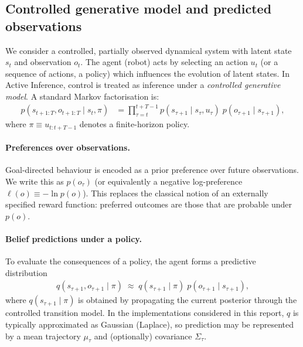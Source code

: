\documentclass[a4paper, twoside]{article}
\begin{document}
\subsection{Controlled generative model and predicted observations}
\label{sec:51_predictive_gm}

We consider a controlled, partially observed dynamical system with latent state $s_t$ and observation $o_t$. The agent (robot) acts by selecting an action $u_t$ (or a sequence of actions, a policy) which influences the evolution of latent states. In Active Inference, control is treated as inference under a \emph{controlled generative model}. A standard Markov factorisation is:
\begin{align}
p(s_{t+1:T}, o_{t+1:T} \mid s_t, \pi)
&=
\prod_{\tau=t}^{t+T-1}
p(s_{\tau+1} \mid s_{\tau}, u_\tau)\;
p(o_{\tau+1} \mid s_{\tau+1}),
\label{eq:controlled_generative_model}
\end{align}
where $\pi \equiv u_{t:t+T-1}$ denotes a finite-horizon policy.

\paragraph{Preferences over observations.}
Goal-directed behaviour is encoded as a prior preference over future observations. We write this as $p(o_\tau)$ (or equivalently a negative log-preference $\ell(o) \equiv -\ln p(o)$). This replaces the classical notion of an externally specified reward function: preferred outcomes are those that are probable under $p(o)$.

\paragraph{Belief predictions under a policy.}
To evaluate the consequences of a policy, the agent forms a predictive distribution
\begin{align}
q(s_{\tau+1}, o_{\tau+1} \mid \pi)
\;\approx\;
q(s_{\tau+1}\mid \pi)\;p(o_{\tau+1}\mid s_{\tau+1}),
\label{eq:predictive_belief_factor}
\end{align}
where $q(s_{\tau+1}\mid \pi)$ is obtained by propagating the current posterior through the controlled transition model. In the implementations considered in this report, $q$ is typically approximated as Gaussian (Laplace), so prediction may be represented by a mean trajectory $\mu_{\tau}$ and (optionally) covariance $\Sigma_{\tau}$.
\end{document}
